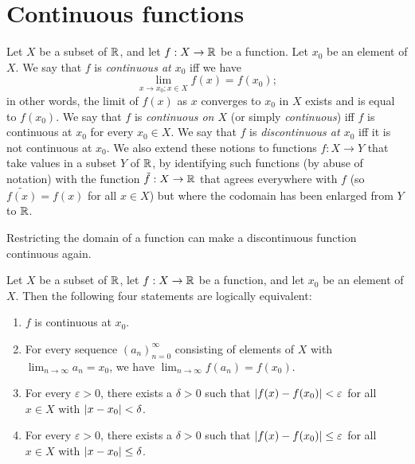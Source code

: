 \section{Continuous functions}\label{i:sec:9.4}

\begin{defn}[Continuity]\label{i:9.4.1}
  Let \(X\) be a subset of \(\mathbb{R}\), and let \(f : X \to \mathbb{R}\) be a function.
  Let \(x_0\) be an element of \(X\).
  We say that \(f\) is \emph{continuous at \(x_0\)} iff we have
  \[
    \lim_{x \to x_0 ; x \in X} f(x) = f(x_0);
  \]
  in other words, the limit of \(f(x)\) as \(x\) converges to \(x_0\) in \(X\) exists and is equal to \(f(x_0)\).
  We say that \(f\) is \emph{continuous on \(X\)} (or simply \emph{continuous}) iff \(f\) is continuous at \(x_0\) for every \(x_0 \in X\).
  We say that \(f\) is \emph{discontinuous at \(x_0\)} iff it is not continuous at \(x_0\).
  We also extend these notions to functions \(f : X \to Y\) that take values in a subset \(Y\) of \(\mathbb{R}\), by identifying such functions (by abuse of notation) with the function \(\tilde{f} : X \to \mathbb{R}\) that agrees everywhere with \(f\) (so \(\tilde{f(x)} = f(x)\) for all \(x \in X\)) but where the codomain has been enlarged from \(Y\) to \(\mathbb{R}\).
\end{defn}

\begin{note}
  Restricting the domain of a function can make a discontinuous function continuous again.
\end{note}

\setcounter{thm}{6}
\begin{prop}\label{i:9.4.7}
  Let \(X\) be a subset of \(\mathbb{R}\), let \(f : X \to \mathbb{R}\) be a function, and let \(x_0\) be an element of \(X\).
  Then the following four statements are logically equivalent:
  \begin{enumerate}
    \item\label{i:9.4.7.a} \(f\) is continuous at \(x_0\).
    \item\label{i:9.4.7.b} For every sequence \((a_n)_{n = 0}^\infty\) consisting of elements of \(X\) with \(\lim_{n \to \infty} a_n = x_0\), we have \(\lim_{n \to \infty} f(a_n) = f(x_0)\).
    \item\label{i:9.4.7.c} For every \(\varepsilon > 0\), there exists a \(\delta > 0\) such that \(\left\lvert f(x) - f(x_0)\right\rvert < \varepsilon\) for all \(x \in X\) with \(\left\lvert x - x_0\right\rvert < \delta\).
    \item\label{i:9.4.7.d} For every \(\varepsilon > 0\), there exists a \(\delta > 0\) such that \(\left\lvert f(x) - f(x_0)\right\rvert \leq \varepsilon\) for all \(x \in X\) with \(\left\lvert x - x_0\right\rvert \leq \delta\).
  \end{enumerate}
\end{prop}

